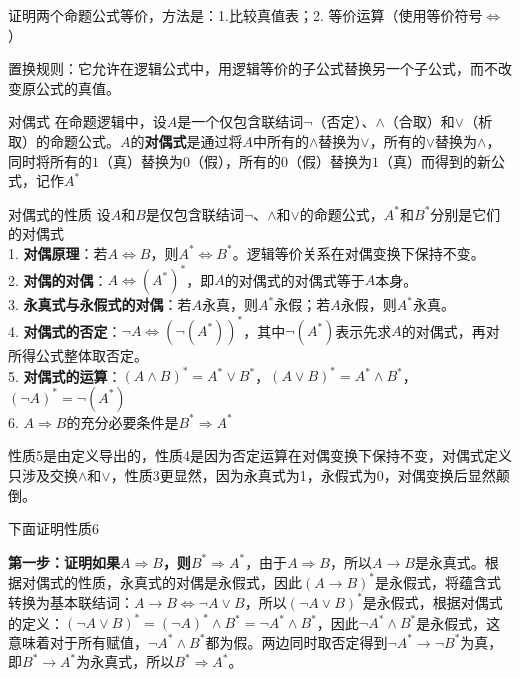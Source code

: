 \documentclass[lang=cn,11pt]{elegantbook}
\begin{document}
证明两个命题公式等价，方法是：1.比较真值表；2. 等价运算（使用等价符号$\Leftrightarrow$）

置换规则：它允许在逻辑公式中，用逻辑等价的子公式替换另一个子公式，而不改变原公式的真值。
\begin{definition}{对偶式}
    在命题逻辑中，设$A$是一个仅包含联结词$\neg$（否定）、$\land$（合取）和$\lor$（析取）的命题公式。$A$的\textbf{对偶式}是通过将$A$中所有的$\land$替换为$\lor$，所有的$\lor$替换为$\land$，同时将所有的$1$（真）替换为$0$（假），所有的$0$（假）替换为$1$（真）而得到的新公式，记作$A^*$
\end{definition}
\begin{theorem}{对偶式的性质}
设$A$和$B$是仅包含联结词$\neg$、$\land$和$\lor$的命题公式，$A^*$和$B^*$分别是它们的对偶式\\
1. \textbf{对偶原理}：若$A \Leftrightarrow B$，则$A^* \Leftrightarrow B^*$。逻辑等价关系在对偶变换下保持不变。\\
2. \textbf{对偶的对偶}：$A \Leftrightarrow (A^*)^*$，即$A$的对偶式的对偶式等于$A$本身。\\
3. \textbf{永真式与永假式的对偶}：若$A$永真，则$A^*$永假；若$A$永假，则$A^*$永真。\\
4. \textbf{对偶式的否定}：$\neg A \Leftrightarrow (\neg(A^*))^*$，其中$\neg(A^*)$表示先求$A$的对偶式，再对所得公式整体取否定。\\
5. \textbf{对偶式的运算}：$(A \land B)^* = A^* \lor B^*$，$(A \lor B)^* = A^* \land B^*$，$(\neg A)^* = \neg (A^*)$\\
6. $A\Rightarrow B$的充分必要条件是$B^* \Rightarrow A^*$
\end{theorem}
性质5是由定义导出的，性质4是因为否定运算在对偶变换下保持不变，对偶式定义只涉及交换$\land$和$\lor$，性质3更显然，因为永真式为1，永假式为0，对偶变换后显然颠倒。

下面证明性质6

\textbf{第一步：证明如果$A \Rightarrow B$，则$B^* \Rightarrow A^*$}，由于$A \Rightarrow B$，所以$A \rightarrow B$是永真式。根据对偶式的性质，永真式的对偶是永假式，因此$(A \rightarrow B)^* $是永假式，将蕴含式转换为基本联结词：$A \rightarrow B \Leftrightarrow \neg A \lor B$，所以$(\neg A \lor B)^* \text{是永假式}$，根据对偶式的定义：$(\neg A \lor B)^* = (\neg A)^* \land B^* = \neg A^* \land B^*$，因此$\neg A^* \land B^*$是永假式，这意味着对于所有赋值，$\neg A^* \land B^*$都为假。两边同时取否定得到$\neg A^* \rightarrow \neg B^*$为真，即$B^* \rightarrow A^*$为永真式，所以$B^* \Rightarrow A^*$。
\end{document}
